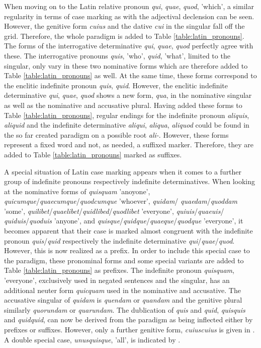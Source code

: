 \documentclass[11pt,a4paper,twoside,openright]{scrbook}
\begin{document}
When moving on to the Latin relative pronoun \textit{qui}, \textit{quae}, \textit{quod}, 'which', a similar regularity in terms of case marking as with the adjectival declension can be seen. However, the genitive form \textit{cuius} and the dative \textit{cui} in the singular fall off the grid. Therefore, the whole paradigm is added to Table \ref{table:latin_pronouns}. The forms of the interrogative determinative \textit{qui}, \textit{quae}, \textit{quod} perfectly agree with these. The interrogative pronouns \textit{quis}, 'who', \textit{quid}, 'what', limited to the singular, only vary in these two nominative forms which are therefore added to Table \ref{table:latin_pronouns} as well. At the same time, these forms correspond to the enclitic indefinite pronoun \textit{quis}, \textit{quid}. However, the enclitic indefinite determinative \textit{qui}, \textit{quae}, \textit{quod} shows a new form, \textit{qua}, in the nominative singular as well as the nominative and accusative plural. Having added these forms to Table \ref{table:latin_pronouns}, regular endings for the indefinite pronoun \textit{aliquis}, \textit{aliquid} and the indefinite determinative \textit{aliqui}, \textit{aliqua}, \textit{aliquod} could be found in the so far created paradigm on a possible root \textit{ali-}. However, these forms represent a fixed word and not, as needed, a suffixed marker. Therefore, they are added to Table \ref{table:latin_pronouns} marked as suffixes. 

 A special situation of Latin case marking appears when it comes to a further group of indefinite pronouns respectively indefinite determinatives. When looking at the nominative forms of \textit{quisquam} 'anoyone', \textit{quicumque}/\textit{quaecumque}/\textit{quodcumque} 'whoever', \textit{quidam}/ \textit{quaedam}/\textit{quoddam} 'some', \textit{quilibet}/\textit{quaelibet}/\textit{quidlibed}/\textit{quodlibet} 'everyone', \textit{quiuis}/\textit{quaeuis}/ \textit{quiduis}/\textit{quoduis} 'anyone', and \textit{quisque}/\textit{quidque}/\textit{quaeque}/\textit{quodque} 'everyone', it becomes apparent that their case is marked  almost congruent with the indefinite pronoun \textit{quis}/\textit{quid} respectively the indefinite determinative \textit{qui}/\textit{quae}/\textit{quod}. However, this is now realized as a prefix. In order to include this special case to the paradigm, these pronominal forms and some special variants are added to Table \ref{table:latin_pronouns} as prefixes.
The indefinite pronoun \textit{quisquam}, 'everyone', exclusively used in negated sentences and the singular, has an additional neuter form \textit{quicquam} used in the nominative and accusative. The accusative singular of \textit{quidam} is \textit{quendam} or \textit{quandam} and the genitive plural similarly \textit{quorundam} or \textit{quarundam}. 
The dublication of \textit{quis} and \textit{quid}, \textit{quisquis} and \textit{quidquid}, can now be derived from the paradigm as being inflected either by prefixes or suffixes. However, only a further genitive form, \textit{cuiuscuius} is given in \citep{touratier2013lat}.
A double special case, \textit{unusquisque}, 'all', is indicated by \citep{rubenbauer1995lat}.
\end{document}
